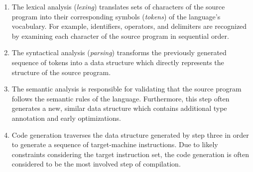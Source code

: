 \begin{enumerate}
	\item The lexical analysis (\emph{lexing}) translates sets of characters of the source program
	      into their corresponding symbols (\emph{tokens}) of the language's vocabulary.
	      For example, identifiers, operators, and delimiters are recognized
	      by examining each character of the source program in sequential order.
	\item The syntactical analysis (\emph{parsing}) transforms the previously generated sequence of tokens
	      into a data structure which directly represents the structure of the source program.
	\item The semantic analysis is responsible for validating
	      that the source program follows the semantic rules of the language.
	      Furthermore, this step often generates a new, similar data structure which contains additional type annotation and early optimizations.
	\item Code generation traverses the data structure generated by step three
	      in order to generate a sequence of target-machine instructions.
	      Due to likely constraints considering the target instruction set,
	      the code generation is often considered to be the most involved step of compilation.
\end{enumerate}
\cite[pp.~6--7]{wirth_compiler_construction_2005}
